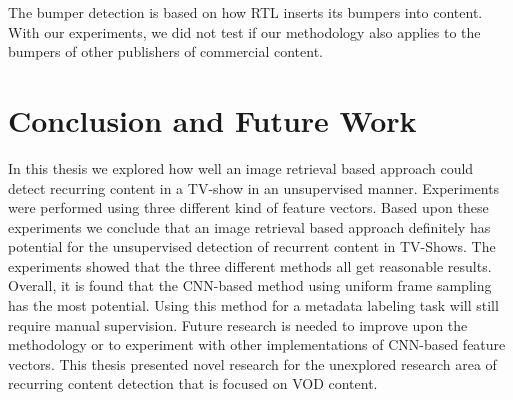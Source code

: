 \documentclass{report}
\begin{document}
The bumper detection is based on how RTL inserts its bumpers into content. With our experiments, we did not test if our methodology also applies to the bumpers of other publishers of commercial content.
\\

\chapter{Conclusion and Future Work} \label{conclusion}
In this thesis we explored how well an image retrieval based approach could detect recurring content in a TV-show in an unsupervised manner. Experiments were performed using three different kind of feature vectors. Based upon these experiments we conclude that an image retrieval based approach definitely has potential for the unsupervised detection of recurrent content in TV-Shows. The experiments showed that the three different methods all get reasonable results. Overall, it is found that the CNN-based method using uniform frame sampling has the most potential. Using this method for a metadata labeling task will still require manual supervision. Future research is needed to improve upon the methodology or to experiment with other implementations of CNN-based feature vectors. This thesis presented novel research for the unexplored research area of recurring content detection that is focused on VOD content.
\end{document}
